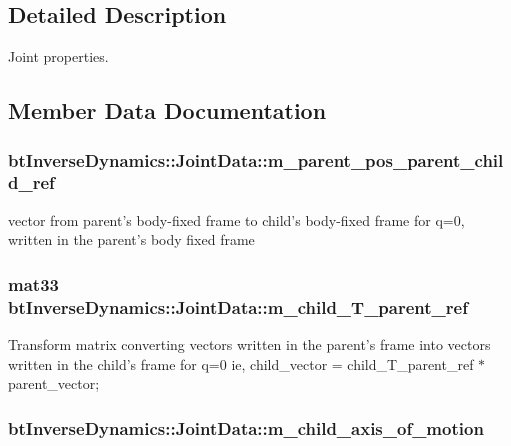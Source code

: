 \subsection{Detailed Description}
Joint properties. 

\subsection{Member Data Documentation}
\hypertarget{structbt_inverse_dynamics_1_1_joint_data_56c1cd9b4021ca0c202cd059e0759993}{
\subsubsection[m\_\-parent\_\-pos\_\-parent\_\-child\_\-ref]{ {\bf btInverseDynamics::JointData::m\_\-parent\_\-pos\_\-parent\_\-child\_\-ref}}}
\label{structbt_inverse_dynamics_1_1_joint_data_56c1cd9b4021ca0c202cd059e0759993}


vector from parent's body-fixed frame to child's body-fixed frame for q=0, written in the parent's body fixed frame \hypertarget{structbt_inverse_dynamics_1_1_joint_data_6725b907ac280e9fd3d1fa8f0032fda4}{
\subsubsection[m\_\-child\_\-T\_\-parent\_\-ref]{\setlength{\rightskip}{0pt plus 5cm}mat33 {\bf btInverseDynamics::JointData::m\_\-child\_\-T\_\-parent\_\-ref}}}
\label{structbt_inverse_dynamics_1_1_joint_data_6725b907ac280e9fd3d1fa8f0032fda4}


Transform matrix converting vectors written in the parent's frame into vectors written in the child's frame for q=0 ie, child\_\-vector = child\_\-T\_\-parent\_\-ref $\ast$ parent\_\-vector; \hypertarget{structbt_inverse_dynamics_1_1_joint_data_e237c62f233031b18eec950090a1f576}{
\subsubsection[m\_\-child\_\-axis\_\-of\_\-motion]{ {\bf btInverseDynamics::JointData::m\_\-child\_\-axis\_\-of\_\-motion}}}
\label{structbt_inverse_dynamics_1_1_joint_data_e237c62f233031b18eec950090a1f576}


